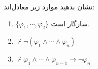نشان بدهید موارد زیر معادل‌اند:
\begin{enumerate}[label=(\alph*)]
    \item
    $\{\varphi_1,\cdots,\varphi_2\}$
    سازگار است.
    \item $\not\vdash\neg(\varphi_1\wedge\cdots\wedge\varphi_n)$
    \item $\not\vdash\varphi_1\wedge\cdots\wedge\varphi_{n-1}\to\neg\varphi_n$
\end{enumerate}
